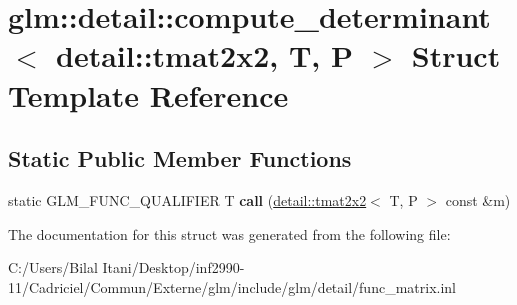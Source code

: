\hypertarget{structglm_1_1detail_1_1compute__determinant_3_01detail_1_1tmat2x2_00_01_t_00_01_p_01_4}{}\section{glm\+:\+:detail\+:\+:compute\+\_\+determinant$<$ detail\+:\+:tmat2x2, T, P $>$ Struct Template Reference}
\label{structglm_1_1detail_1_1compute__determinant_3_01detail_1_1tmat2x2_00_01_t_00_01_p_01_4}
\subsection*{Static Public Member Functions}
\begin{DoxyCompactItemize}
\item 
static G\+L\+M\+\_\+\+F\+U\+N\+C\+\_\+\+Q\+U\+A\+L\+I\+F\+I\+ER T {\bfseries call} (\hyperlink{structglm_1_1detail_1_1tmat2x2}{detail\+::tmat2x2}$<$ T, P $>$ const \&m)\hypertarget{structglm_1_1detail_1_1compute__determinant_3_01detail_1_1tmat2x2_00_01_t_00_01_p_01_4_a58a62a3968a9af7acd4522972236742e}{}\label{structglm_1_1detail_1_1compute__determinant_3_01detail_1_1tmat2x2_00_01_t_00_01_p_01_4_a58a62a3968a9af7acd4522972236742e}

\end{DoxyCompactItemize}


The documentation for this struct was generated from the following file\+:\begin{DoxyCompactItemize}
\item 
C\+:/\+Users/\+Bilal Itani/\+Desktop/inf2990-\/11/\+Cadriciel/\+Commun/\+Externe/glm/include/glm/detail/func\+\_\+matrix.\+inl\end{DoxyCompactItemize}
